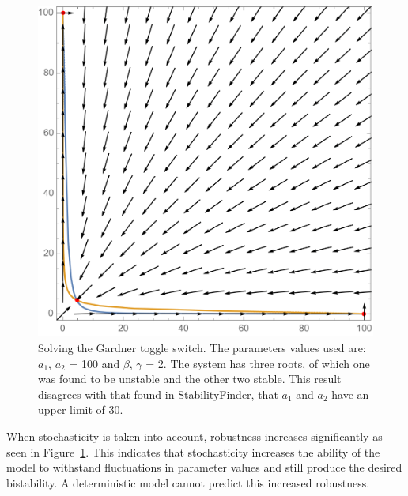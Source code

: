 \begin{figure}[h]
\centering
\includegraphics[scale=0.2]{chapterStabilityFinder/images/Gardner/gardner_solve_roots_a1a2_big.png}
\caption[Solving the Gardner toggle switch.]{Solving the Gardner toggle switch. The parameters values used are:  $a_1$, $a_2$ = 100 and $\beta$, $\gamma$ = 2. The system has three roots, of which one was found to be unstable and the other two stable. This result disagrees with that found in StabilityFinder, that $a_1$ and $a_2$ have an upper limit of 30.}
\label{fig:Gard_robst}
\end{figure}

 When stochasticity is taken into account, robustness increases significantly as seen in Figure~\ref{fig:Gard_robst}. This indicates that stochasticity increases the ability of the model to withstand fluctuations in parameter values and still produce the desired bistability. A deterministic model cannot predict this increased robustness.
 
